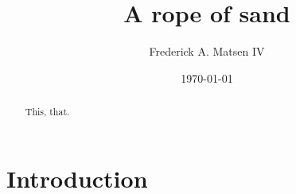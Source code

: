 \documentclass{amsart}
\title{A rope of sand}
\author[Matsen]{Frederick A. Matsen IV}
\date{\today}
\begin{document}
\begin{abstract}
This, that.
\end{abstract}

\maketitle

\makeatletter
\providecommand\@dotsep{5}
\makeatother
\listoftodos\relax



\section{Introduction}
\end{document}
